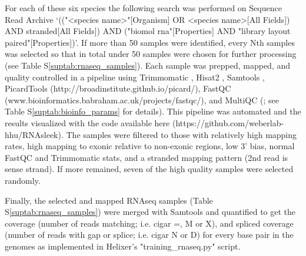 \documentclass{bioinfo}
\newcounter{suptab}
\begin{document}
\begin{methods}
For each of these six species the following search was performed on Sequence Read Archive \citep{leinonen2010sequence}
`(("<species name>"[Organism] OR <species name>[All Fields]) AND stranded[All Fields]) 
AND ("biomol rna"[Properties] AND "library layout paired"[Properties])'.
If more than 50 samples were identified, every Nth samples was selected 
so that in total under 50 samples were chosen for further processing
(see Table S\ref{suptab:rnaseq_samples}).
Each sample was prepped, mapped, and quality controlled in a pipeline using Trimmomatic 
\citep{bolger2014trimmomatic}, 
Hisat2 \citep{kim2019graph}, Samtools \citep{li2009sequence}, PicardTools 
(http://broadinstitute.github.io/picard/), 
FastQC 
(www.bioinformatics.babraham.ac.uk/projects/fastqc/),
and MultiQC (\cite{ewels2016multiqc}; see
Table S\ref{suptab:bioinfo_params} for details). This pipeline was 
automated and the results visualized with the code available here (https://github.com/weberlab-hhu/RNAsleek).
The samples were filtered to those with relatively high mapping rates, high mapping to
exonic relative to non-exonic regions, low 3' bias, normal FastQC and Trimmomatic stats, 
and a stranded mapping pattern (2nd read is sense strand). If more remained, seven
of the high quality samples were selected randomly.

Finally, the selected and mapped RNAseq samples (Table S\ref{suptab:rnaseq_samples}) were merged with Samtools 
and quantified to get the coverage (number of reads matching; i.e. cigar =, M or X),
and spliced coverage (number of reads with gap or splice; i.e. cigar N or D)
for every base pair in the genomes as implemented in Helixer's "training\_rnaseq.py"
script.

\end{methods}
\end{document}
